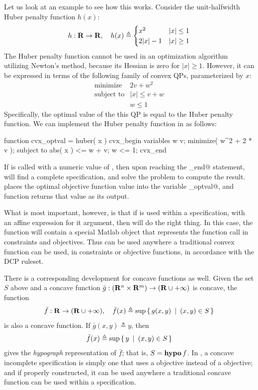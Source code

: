 \documentclass[12pt]{article}
\begin{document}
Let us look at an example to see how this works.
Consider the unit-halfwidth Huber penalty function $h(x)$:
\begin{equation}
	h:\R\rightarrow\R, \quad h(x) \eqbydef \Cases{ x^2 & |x| \leq 1 \\ 2|x|-1 & |x| \geq 1 }
\end{equation}
The Huber penalty function cannot be used in an optimization algorithm
utilizing Newton's method,
because its Hessian is zero for $|x|\geq 1$. However,
it can be expressed in terms of the following family of convex QPs,
parameterized by $x$:
\begin{equation}
	\begin{array}{ll}
		\text{minimize}   & 2 v + w^2 \\
		\text{subject to} & | x | \leq v + w \\
		                  & w \leq 1
	\end{array}
\end{equation}
Specifically, the optimal value of the this QP is equal to the Huber
penalty function.
We can implement the Huber penalty function in \cvx as follows:
\begin{code}
	function cvx_optval = huber( x )
	cvx_begin
	    variables w v;
	    minimize( w^2 + 2 * v );
	    subject to
	        abs( x ) <= w + v;
	        w <= 1;
	cvx_end
\end{code}
If \verb@huber@ is called with a numeric value of \verb@x@, then
upon reaching the \verb@cvx_end@ statement, \cvx will find a complete
specification, and solve the problem to compute the result.
\cvx places the optimal objective function value
into the variable \verb@cvx_optval@, and
function returns that value as its output.

What is most important, however, is that if \verb@huber@
is used within a \cvx specification, with an affine \cvx expression
for it argument, then \cvx will do the right thing.
In this case, the function \verb@huber@ will contain a special Matlab object that
represents the function call in constraints and objectives.
Thus \verb@huber@ can be used anywhere a traditional convex
function can be used, in constraints or objective functions,
in accordance with the DCP ruleset.

There is a corresponding development for concave functions as well.
Given the set
$S$ above and a concave function
$\bar{g}:(\R^n\times\R^m)\rightarrow(\R\cup+\infty)$ is
concave, the function
\begin{equation}
	\label{eq:partial2}
	\bar{f}:\R\rightarrow(\R\cup+\infty), \quad \bar{f}(x) \triangleq \sup\Condset{g(x,y)}{(x,y)\in S }
\end{equation}
is also a concave function.
If $\bar{g}(x,y)\triangleq y$, then
\begin{equation}
	\bar{f}(x) \triangleq \sup\left\{\,y\,~|~\,(x,y)\in S\,\right\}
\end{equation}
gives the \emph{hypograph} representation of $\bar{f}$; that is, $S=\operatorname{\textbf{hypo}} f$.
In \cvx, a concave incomplete specification is simply one that
uses a \verb@maximize@ objective instead of a \verb@minimize@ objective;
and if properly constructed, it can be used anywhere a traditional
concave function can be used within a \cvx specification. 
\end{document}
